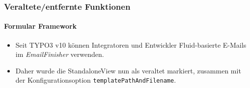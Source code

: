 %

\begin{frame}[fragile]
	\frametitle{Veraltete/entfernte Funktionen}
	\framesubtitle{Formular Framework}

	\begin{itemize}
		\item Seit TYPO3 v10 können Integratoren und Entwickler Fluid-basierte E-Mails
			im \textit{EmailFinisher} verwenden.
		\item Daher wurde die StandaloneView nun als veraltet markiert, zusammen
			mit der Konfigurationsoption \texttt{templatePathAndFilename}.
	\end{itemize}

\end{frame}

